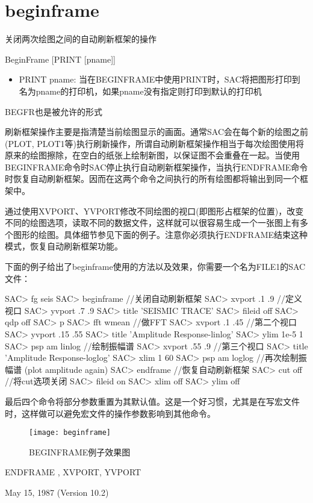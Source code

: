 \section{beginframe}
\label{cmd:beginframe}

关闭两次绘图之间的自动刷新框架的操作

BeginFrame [PRINT [pname]]

\begin{itemize}
\item PRINT pname: 当在BEGINFRAME中使用PRINT时，SAC将把图形打印到名为pname的打印机，如果pname没有指定则打印到默认的打印机
\end{itemize}

BEGFR也是被允许的形式

刷新框架操作主要是指清楚当前绘图显示的画面。通常SAC会在每个新的绘图之前(PLOT, PLOT1等)执行刷新操作，所谓自动刷新框架操作相当于每次绘图使用将原来的绘图擦除，在空白的纸张上绘制新图，以保证图不会重叠在一起。当使用BEGINFRAME命令时SAC停止执行自动刷新框架操作，当执行ENDFRAME命令时恢复自动刷新框架。因而在这两个命令之间执行的所有绘图都将输出到同一个框架中。

通过使用XVPORT、YVPORT修改不同绘图的视口(即图形占框架的位置)，改变不同的绘图选项，读取不同的数据文件，这样就可以很容易生成一个一张图上有多个图形的绘图。具体细节参见下面的例子。注意你必须执行ENDFRAME结束这种模式，恢复自动刷新框架功能。

下面的例子给出了beginframe使用的方法以及效果，你需要一个名为FILE1的SAC文件：
\begin{SACCode}
SAC> fg seis
SAC> beginframe          //关闭自动刷新框架
SAC> xvport .1 .9        //定义视口
SAC> yvport .7 .9
SAC> title 'SEISMIC TRACE'
SAC> fileid off
SAC> qdp off
SAC> p
SAC> fft wmean           //做FFT
SAC> xvport .1 .45       //第二个视口
SAC> yvport .15 .55
SAC> title 'Amplitude Response-linlog'
SAC> ylim 1e-5 1
SAC> psp am linlog       //绘制振幅谱
SAC> xvport .55 .9       //第三个视口
SAC> title 'Amplitude Response-loglog'
SAC> xlim 1 60
SAC> psp am loglog       //再次绘制振幅谱 (plot amplitude again)
SAC> endframe            //恢复自动刷新框架
SAC> cut off             //将cut选项关闭
SAC> fileid on
SAC> xlim off
SAC> ylim off
\end{SACCode}
最后四个命令将部分参数重置为其默认值。这是一个好习惯，尤其是在写宏文件时，这样做可以避免宏文件的操作参数影响到其他命令。
\begin{figure}[h]
\centering
\texttt{[image: beginframe]}
\caption{BEGINFRAME例子效果图}
\end{figure}

ENDFRAME , XVPORT, YVPORT

May 15, 1987 (Version 10.2)
